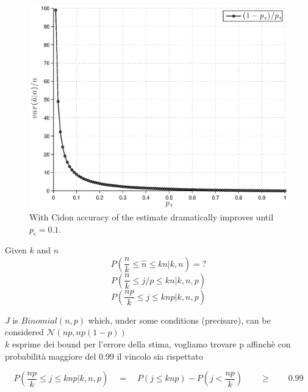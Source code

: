 \documentclass[12pt,a4paper,twocolumns]{report}
\newcommand{\pc}{p_{\epsilon}}
\begin{document}
\begin{figure}[htbp]
\begin{center}
\includegraphics[scale=0.7]{matlab/Cidon/cidon-variance-p}
\caption{With Cidon accuracy of the estimate dramatically improves until $\pc=0.1$.}
\label{default}
\end{center}
\end{figure}


Given $k$ and $n$
\begin{equation}P\left(\frac{n}{k}\leq \hat{n} \leq kn \big| k,n\right)=?\end{equation}
\begin{equation}P\left(\frac{n}{k}\leq j/p \leq kn \big| k,n,p\right)\end{equation}
\begin{equation}P\left(\frac{np}{k}\leq j \leq knp \big| k,n,p\right)\end{equation}

$J$ is $Binomial(n,p)$ which, under some conditions (precisare), can be considered $\mathcal{N}(np,np(1-p))$\\
$k$ esprime dei bound per l'errore della stima, vogliamo trovare p affinchè con probabilità maggiore del 0.99 il vincolo sia rispettato

\begin{equation}
P\left(\frac{np}{k}\leq j \leq knp \big| k,n,p\right)\quad=\quad P(j \leq knp ) - P(j < \frac{np}{k} ) \qquad \geq\qquad 0.99
\end{equation}
\end{document}
